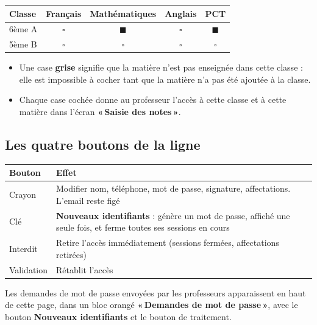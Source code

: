 \documentclass[11pt,a4paper]{article}
\newcommand{\menu}[1]{\textbf{«\,#1\,»}}
\newcommand{\bouton}[1]{\textbf{#1}}
\begin{document}
\begin{center}
\renewcommand{\arraystretch}{1.3}
\begin{tabular}{@{}lcccc@{}}
\toprule
\textbf{Classe} & \textbf{Français} & \textbf{Mathématiques} & \textbf{Anglais} & \textbf{PCT} \\
\midrule
6ème A & $\square$ & $\blacksquare$ & $\square$ & $\blacksquare$ \\
5ème B & $\square$ & $\square$ & $\square$ & $\square$ \\
\bottomrule
\end{tabular}
\end{center}

\begin{itemize}
  \item Une case \textbf{grise} signifie que la matière n'est pas enseignée dans
        cette classe : elle est impossible à cocher tant que la matière n'a pas
        été ajoutée à la classe.
  \item Chaque case cochée donne au professeur l'accès à cette classe et à cette
        matière dans l'écran \menu{Saisie des notes}.
\end{itemize}

\subsection{Les quatre boutons de la ligne}

\begin{center}
\renewcommand{\arraystretch}{1.25}
\begin{tabularx}{\textwidth}{@{} >{\raggedright}p{2.6cm} X@{}}
\toprule
\textbf{Bouton} & \textbf{Effet} \\
\midrule
Crayon & Modifier nom, téléphone, mot de passe, signature, affectations. L'email reste figé \\
Clé & \textbf{Nouveaux identifiants} : génère un mot de passe, affiché une seule fois, et
ferme toutes ses sessions en cours \\
Interdit & Retire l'accès immédiatement (sessions fermées, affectations retirées) \\
Validation & Rétablit l'accès \\
\bottomrule
\end{tabularx}
\end{center}

Les demandes de mot de passe envoyées par les professeurs apparaissent en haut de
cette page, dans un bloc orangé \menu{Demandes de mot de passe}, avec le bouton
\bouton{Nouveaux identifiants} et le bouton de traitement.
\end{document}
